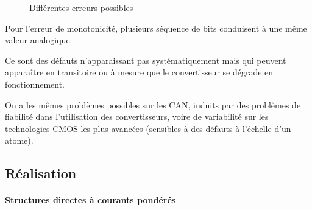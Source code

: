 \documentclass[main.tex]{subfiles}
\begin{document}
\begin{figure}[H]
\begin{subfigure}{0.3\linewidth}
  \end{subfigure}%
\begin{subfigure}{0.3\linewidth}
    \centering
  \end{subfigure}

\caption{Différentes erreurs possibles}
\end{figure}
Pour l'erreur  de monotonicité, plusieurs séquence de bits conduisent à une même valeur analogique.

Ce sont des défauts n'apparaissant pas systématiquement mais qui peuvent apparaître en transitoire ou à mesure que le convertisseur se dégrade en fonctionnement.

On a les mêmes problèmes possibles sur les CAN, induits par des problèmes de fiabilité dans l'utilisation des convertisseurs, voire de variabilité sur les technologies CMOS les plus avancées (sensibles à des défauts à l'échelle d'un atome).

\subsection{Réalisation}

\paragraph{Structures directes à courants pondérés}
\end{document}
